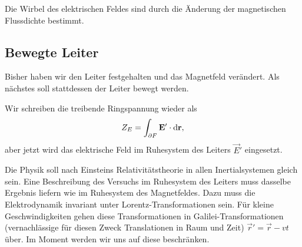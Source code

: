 \begin{formal}
	Die Wirbel des elektrischen Feldes sind durch die Änderung der magnetischen Flussdichte bestimmt.
\end{formal}


\subsection{Bewegte Leiter}

Bisher haben wir den Leiter festgehalten und das Magnetfeld verändert. Als nächstes soll stattdessen der Leiter bewegt werden.

Wir schreiben die treibende Ringspannung wieder als
\begin{equation}
	\label{eq:ringspannung_ruhesystem_leiter}
	Z_{E}=\int _{\partial F}\mathbf{E}'\cdot \mathop{}\!\mathrm{d} \mathbf{r},
\end{equation}
aber jetzt wird das elektrische Feld im Ruhesystem des Leiters $\vec {E}'$ eingesetzt.

Die Physik soll nach Einsteins Relativitätstheorie in allen Inertialsystemen gleich sein. Eine Beschreibung des Versuchs im Ruhesystem des Leiters muss dasselbe Ergebnis liefern wie im Ruhesystem des Magnetfeldes. Dazu muss die Elektrodynamik invariant unter Lorentz-Transformationen sein. Für kleine Geschwindigkeiten gehen diese Transformationen in Galilei-Transformationen (vernachlässige für diesen Zweck Translationen in Raum und Zeit) $\vec {r}'=\vec {r}-vt$ über. Im Moment werden wir uns auf diese beschränken.

